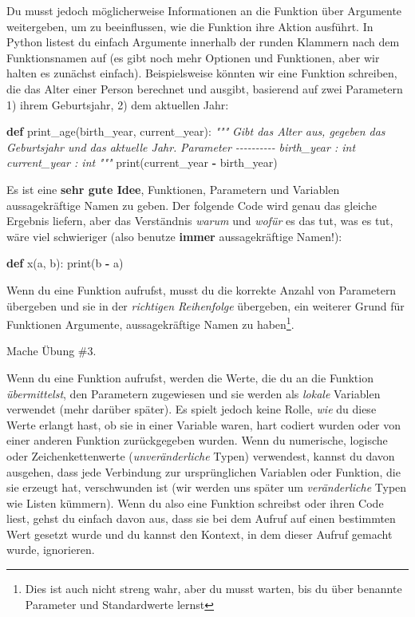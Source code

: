 \documentclass[
]{book}
\newenvironment{Shaded}{\begin{snugshade}}{\end{snugshade}}
\newcommand{\BuiltInTok}[1]{#1}
\newcommand{\CommentTok}[1]{\textcolor[rgb]{0.56,0.35,0.01}{\textit{#1}}}
\newcommand{\KeywordTok}[1]{\textcolor[rgb]{0.13,0.29,0.53}{\textbf{#1}}}
\newcommand{\NormalTok}[1]{#1}
\newcommand{\OperatorTok}[1]{\textcolor[rgb]{0.81,0.36,0.00}{\textbf{#1}}}
\begin{document}
Du musst jedoch möglicherweise Informationen an die Funktion über Argumente weitergeben, um zu beeinflussen, wie die Funktion ihre Aktion ausführt. In Python listest du einfach Argumente innerhalb der runden Klammern nach dem Funktionsnamen auf (es gibt noch mehr Optionen und Funktionen, aber wir halten es zunächst einfach). Beispielsweise könnten wir eine Funktion schreiben, die das Alter einer Person berechnet und ausgibt, basierend auf zwei Parametern 1) ihrem Geburtsjahr, 2) dem aktuellen Jahr:

\begin{Shaded}
\begin{Highlighting}[]
\KeywordTok{def}\NormalTok{ print\_age(birth\_year, current\_year):}
    \CommentTok{"""}
\CommentTok{    Gibt das Alter aus, gegeben das Geburtsjahr und das aktuelle Jahr.}
\CommentTok{    }
\CommentTok{    Parameter}
\CommentTok{    {-}{-}{-}{-}{-}{-}{-}{-}{-}{-}}
\CommentTok{    birth\_year : int}
\CommentTok{    current\_year : int}
\CommentTok{    """}
    \BuiltInTok{print}\NormalTok{(current\_year }\OperatorTok{{-}}\NormalTok{ birth\_year)}
\end{Highlighting}
\end{Shaded}

Es ist eine \textbf{sehr gute Idee}, Funktionen, Parametern und Variablen aussagekräftige Namen zu geben. Der folgende Code wird genau das gleiche Ergebnis liefern, aber das Verständnis \emph{warum} und \emph{wofür} es das tut, was es tut, wäre viel schwieriger (also benutze \textbf{immer} aussagekräftige Namen!):

\begin{Shaded}
\begin{Highlighting}[]
\KeywordTok{def}\NormalTok{ x(a, b):}
    \BuiltInTok{print}\NormalTok{(b }\OperatorTok{{-}}\NormalTok{ a)}
\end{Highlighting}
\end{Shaded}

Wenn du eine Funktion aufrufst, musst du die korrekte Anzahl von Parametern übergeben und sie in der \emph{richtigen Reihenfolge} übergeben, ein weiterer Grund für Funktionen Argumente, aussagekräftige Namen zu haben\footnote{Dies ist auch nicht streng wahr, aber du musst warten, bis du über benannte Parameter und Standardwerte lernst}.

Mache Übung \#3.

Wenn du eine Funktion aufrufst, werden die Werte, die du an die Funktion \emph{übermittelst}, den Parametern zugewiesen und sie werden als \emph{lokale} Variablen verwendet (mehr darüber später). Es spielt jedoch keine Rolle, \emph{wie} du diese Werte erlangt hast, ob sie in einer Variable waren, hart codiert wurden oder von einer anderen Funktion zurückgegeben wurden. Wenn du numerische, logische oder Zeichenkettenwerte (\emph{unveränderliche} Typen) verwendest, kannst du davon ausgehen, dass jede Verbindung zur ursprünglichen Variablen oder Funktion, die sie erzeugt hat, verschwunden ist (wir werden uns später um \emph{veränderliche} Typen wie Listen kümmern). Wenn du also eine Funktion schreibst oder ihren Code liest, gehst du einfach davon aus, dass sie bei dem Aufruf auf einen bestimmten Wert gesetzt wurde und du kannst den Kontext, in dem dieser Aufruf gemacht wurde, ignorieren.
\end{document}
